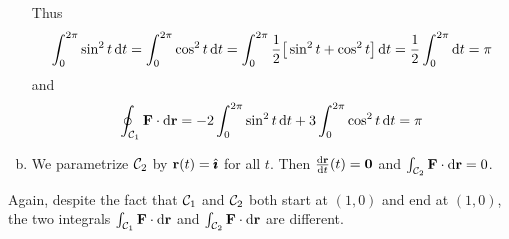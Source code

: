 \begin{eg}
\begin{enumerate}[(a)]
\begin{mfig}
\begin{center}
\end{center}
\end{mfig}
Thus
\begin{align*}
\int_{0}^{2\pi} \sin^2 t\,\mathrm{d}t
=\int_{0}^{2\pi} \cos^2 t\,\mathrm{d}t
=\int_{0}^{2\pi} \frac{1}{2}\big[\sin^2 t+\cos^2t\big]\,\mathrm{d}t
=\frac{1}{2}\int_{0}^{2\pi} \mathrm{d}t
=\pi
\end{align*}
and 
\begin{align*}
\oint_{\mathcal{C}_1}\mathbf{F}\cdot\mathrm{d}\mathbf{r}
=-2\int_{0}^{2\pi} \sin^2 t\,\mathrm{d}t
+3\int_{0}^{2\pi} \cos^2 t\,\mathrm{d}t
=\pi
\end{align*}


\item 
We parametrize $\mathcal{C}_2$ by $\mathbf{r}(t) = \hat{\pmb{\imath}}$ for all $t$. Then 
$\diff{\vr}{t}(t) = \vZero$ and $\int_{\mathcal{C}_2}\mathbf{F}\cdot\mathrm{d}\mathbf{r}=0$.


\end{enumerate}
Again, despite the fact that $\mathcal{C}_1$ and $\mathcal{C}_2$ both start at $(1,0)$
and end at $(1,0)$, the two integrals $\int_{\mathcal{C}_1}\mathbf{F}\cdot\mathrm{d}\mathbf{r}$ and 
$\int_{\mathcal{C}_2}\mathbf{F}\cdot\mathrm{d}\mathbf{r}$ are different.

\end{eg}

